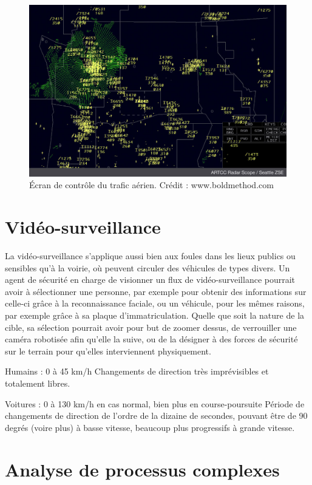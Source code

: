 	\begin{figure}[ht]
		\centering
		\includegraphics[width=\textwidth]{figures/Radar-Scope-ZSE}
		\caption{Écran de contrôle du trafic aérien. Crédit : www.boldmethod.com}
		\label{fig:airtraffic}
	\end{figure}
	
	\section{Vidéo-surveillance}
	La vidéo-surveillance s'applique aussi bien aux foules dans les lieux publics ou sensibles qu'à la voirie, où peuvent circuler des véhicules de types divers. Un agent de sécurité en charge de visionner un flux de vidéo-surveillance pourrait avoir à sélectionner une personne, par exemple pour obtenir des informations sur celle-ci grâce à la reconnaissance faciale, ou un véhicule, pour les mêmes raisons, par exemple grâce à sa plaque d'immatriculation. Quelle que soit la nature de la cible, sa sélection pourrait avoir pour but de zoomer dessus, de verrouiller une caméra robotisée afin qu'elle la suive, ou de la désigner à des forces de sécurité sur le terrain pour qu'elles interviennent physiquement.
	
	Humains : 0 à 45 km/h
	Changements de direction très imprévisibles et totalement libres.
	
	Voitures : 0 à 130 km/h en cas normal, bien plus en course-poursuite
	Période de changements de direction de l'ordre de la dizaine de secondes, pouvant être de 90 degrés (voire plus) à basse vitesse, beaucoup plus progressifs à grande vitesse.
	
	\section{Analyse de processus complexes}
	
